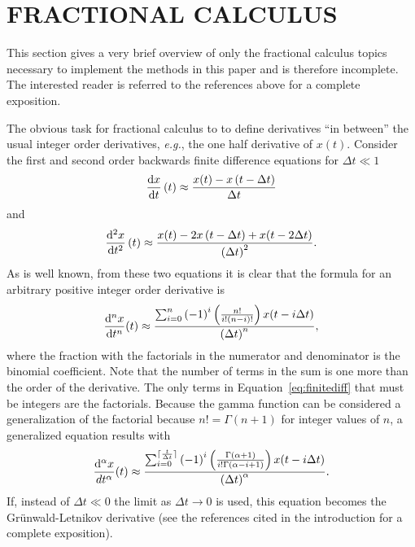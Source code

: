 \section{FRACTIONAL CALCULUS}
\label{sec:fractional}

  This section gives a very brief overview of only the fractional calculus
  topics necessary to implement the methods in this paper and is therefore
  incomplete. The interested reader is referred to the references above for a
  complete exposition.

  The obvious task for fractional calculus to to define derivatives ``in
  between'' the usual integer order derivatives, \textit{e.g.}, the one half
  derivative of $x(t)$. Consider the first and second order backwards finite
  difference equations for $\Delta t \ll 1$
 \[
 \frac{\mathrm{d} x}{\mathrm{d} t}\left(t\right) \approx \frac{x(t) - x \left(t - \Delta
 t\right)}{\Delta t}
 \]
 and
 \[
    \frac{\mathrm{d}^2 x}{\mathrm{d} t^2}\left(t\right) \approx \frac{x(t) - 2 x \left(t - \Delta
    t\right) + x(t - 2 \Delta t)}{\left( \Delta t \right)^2}.
 \]
 As is well known, from these two equations it is clear that the formula for an
 arbitrary positive integer order derivative is
 \begin{equation}
  \frac{\mathrm{d}^n x}{\mathrm{d} t^n}(t) \approx \frac{\sum_{i=0}^n \left( -1 \right)^i
  \left( \frac{n!}{i! \left( n - i \right)!} \right) x ( t - i \Delta t )}{\left( \Delta t
  \right)^n},
  \label{eq:finitediff}
 \end{equation}
 where the fraction with the factorials in the numerator and denominator is the
 binomial coefficient. Note that the number of terms in the sum is one more than
 the order of the derivative.  The only terms in Equation~\ref{eq:finitediff}
 that must be integers are the factorials. Because the gamma function can be
 considered a generalization of the factorial because $n! = \Gamma(n+1)$ for
 integer values of $n$, a generalized equation results with
 \begin{equation}
    \frac{\mathrm{d}^\alpha x}{d t^\alpha}(t) \approx \frac{\sum_{i=0}^{\lceil
    \frac{t}{\Delta t} \rceil} \left( -1 \right)^i \left(
    \frac{\Gamma(\alpha+1)}{i! \Gamma\left( \alpha - i + 1\right)} \right) x ( t
    - i \Delta t )}{\left( \Delta t \right)^\alpha}.
    \label{eq:gw}
 \end{equation}
 If, instead of $\Delta t \ll 0$ the limit as $\Delta t \rightarrow 0$ is used,
 this equation becomes the Gr\"unwald-Letnikov derivative (see the references
 cited in the introduction for a complete exposition). 
  
